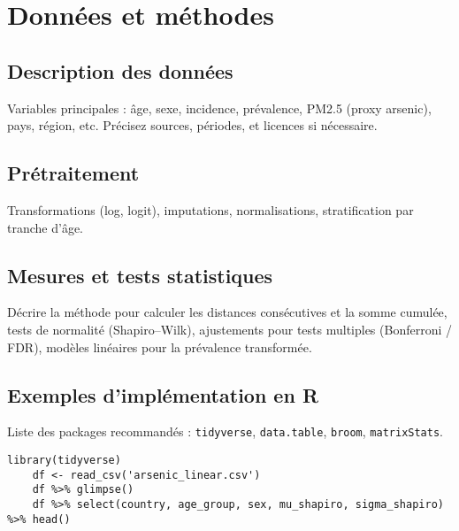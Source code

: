 \chapter{Données et méthodes}
\label{chap:data_methods}
\section{Description des données}
Variables principales : âge, sexe, incidence, prévalence, PM2.5 (proxy arsenic), pays, région, etc. Précisez sources, périodes, et licences si nécessaire.


\section{Prétraitement}
Transformations (log, logit), imputations, normalisations, stratification par tranche d'âge.


\section{Mesures et tests statistiques}
Décrire la méthode pour calculer les distances consécutives et la somme cumulée, tests de normalité (Shapiro--Wilk), ajustements pour tests multiples (Bonferroni / FDR), modèles linéaires pour la prévalence transformée.


\section{Exemples d'implémentation en R}
Liste des packages recommandés : \texttt{tidyverse}, \texttt{data.table}, \texttt{broom}, \texttt{matrixStats}.
\begin{lstlisting}[caption={Extrait : lecture et résumé de arsenic\_linear.csv}]
	library(tidyverse)
	df <- read_csv('arsenic_linear.csv')
	df %>% glimpse()
	df %>% select(country, age_group, sex, mu_shapiro, sigma_shapiro) %>% head()
\end{lstlisting}
